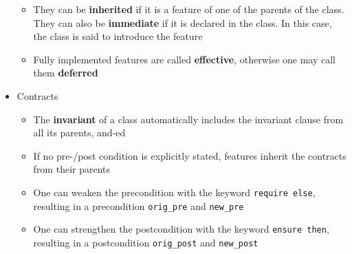 \documentclass[a4paper]{article}
\newcommand{\inline}[1]{\lstinline!#1!}%
\begin{document}
\begin{itemize}
\begin{itemize}
\item They can be \textbf{inherited} if it is a feature of one of the parents of the class. They can also be \textbf{immediate} if it is declared in the class. In this case, the class is said to introduce the feature
\item Fully implemented features are called \textbf{effective}, otherwise one may call them \textbf{deferred}
\end{itemize}
\item Contracts 
\begin{itemize}
\item The \textbf{invariant} of a class automatically includes the invariant clause from all its parents, and-ed
\item If no pre-/post condition is explicitly stated, features inherit the contracts from their parents
\item One can weaken the precondition with the keyword \inline{require else}, resulting in a precondition \inline{orig_pre} and \inline{new_pre}
\item One can strengthen the postcondition with the keyword \inline{ensure then}, resulting in a postcondition \inline{orig_post} and \inline{new_post}
\end{itemize}
\end{itemize}
\end{document}
